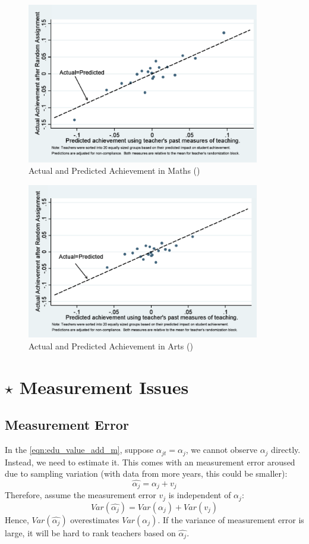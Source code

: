         \begin{figure}[H]
            \centering
            \includegraphics[width=4in]{images/ch9/9 kane math.png}
            \caption{Actual and Predicted Achievement in Maths (\cite{kane_have_2013})}
        \end{figure}
        \begin{figure}[H]
            \centering
            \includegraphics[width=4in]{images/ch9/9 kane arts.png}
            \caption{Actual and Predicted Achievement in Arts (\cite{kane_have_2013})}
        \end{figure}
        
\section{$\star$ Measurement Issues}

    \subsection{Measurement Error}

        In the \ref{eqn:edu_value_add_m}, suppose $\alpha_{jt}=\alpha_{j}$, we cannot observe $\alpha_j$ directly. Instead, we need to estimate it. This comes with an measurement error aroused due to sampling variation (with data from more years, this could be smaller):
        $$\widehat{\alpha_j}=\alpha_j + v_j$$
        Therefore, assume the measurement error $v_j$ is independent of $\alpha_j$:
        $$Var(\widehat{\alpha_j})=Var(\alpha_j)+Var(v_j)$$
        Hence, $Var(\widehat{\alpha_j})$ overestimates $Var(\alpha_j)$. If the variance of measurement error is large, it will be hard to rank teachers based on $\widehat{\alpha_j}$.

